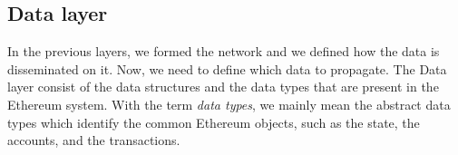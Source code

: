 \subsection{Data layer}

In the previous layers, we formed the network and we defined how the data is
disseminated on it. Now, we need to define which data to propagate. The Data
layer consist of the data structures and the data types that are present in the
Ethereum system. With the term \emph{data types}, we mainly mean the abstract
data types which identify the common Ethereum objects, such as the state, the
accounts, and the transactions.
